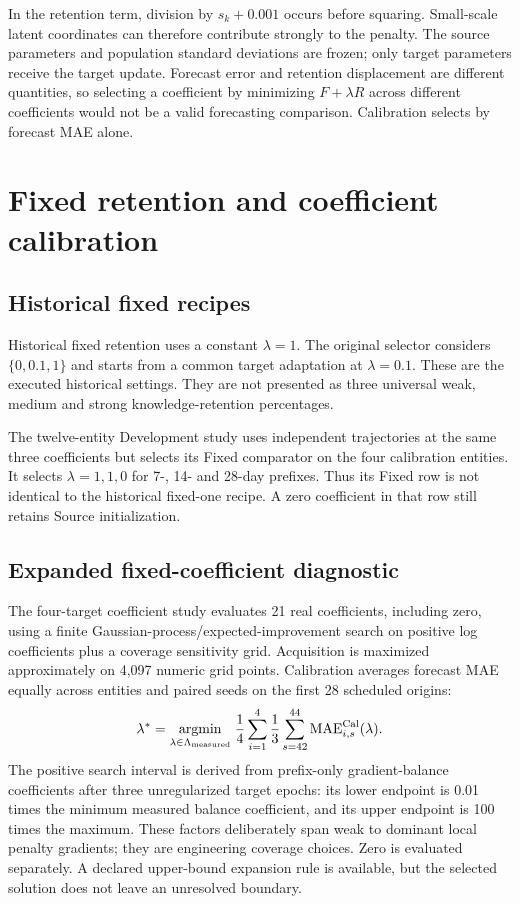 \documentclass[pdflatex,iicol,sn-mathphys-num]{sn-jnl}
\begin{document}
In the retention term, division by $s_k+0.001$ occurs before squaring. Small-scale latent coordinates can therefore contribute strongly to the penalty. The source parameters and population standard deviations are frozen; only target parameters receive the target update. Forecast error and retention displacement are different quantities, so selecting a coefficient by minimizing $F+\lambda R$ across different coefficients would not be a valid forecasting comparison. Calibration selects by forecast MAE alone.

\section{Fixed retention and coefficient calibration}
\subsection{Historical fixed recipes}
Historical fixed retention uses a constant $\lambda=1$. The original selector considers $\{0,0.1,1\}$ and starts from a common target adaptation at $\lambda=0.1$. These are the executed historical settings. They are not presented as three universal weak, medium and strong knowledge-retention percentages.

The twelve-entity Development study uses independent trajectories at the same three coefficients but selects its Fixed comparator on the four calibration entities. It selects $\lambda=1,1,0$ for 7-, 14- and 28-day prefixes. Thus its Fixed row is not identical to the historical fixed-one recipe. A zero coefficient in that row still retains Source initialization.

\subsection{Expanded fixed-coefficient diagnostic}
The four-target coefficient study evaluates 21 real coefficients, including zero, using a finite Gaussian-process/expected-improvement search on positive log coefficients plus a coverage sensitivity grid. Acquisition is maximized approximately on 4,097 numeric grid points. Calibration averages forecast MAE equally across entities and paired seeds on the first 28 scheduled origins:
\begin{equation}
\lambda^*=\underset{\lambda\in\Lambda_{\rm measured}}{\operatorname{argmin}}\;
\frac{1}{4}\sum_{i=1}^4\frac{1}{3}\sum_{s=42}^{44}
\operatorname{MAE}^{\rm Cal}_{i,s}(\lambda).
\label{eq:fixedselection}
\end{equation}
The positive search interval is derived from prefix-only gradient-balance coefficients after three unregularized target epochs: its lower endpoint is 0.01 times the minimum measured balance coefficient, and its upper endpoint is 100 times the maximum. These factors deliberately span weak to dominant local penalty gradients; they are engineering coverage choices. Zero is evaluated separately. A declared upper-bound expansion rule is available, but the selected solution does not leave an unresolved boundary.
\end{document}
